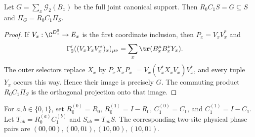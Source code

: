 \begin{lemma}
    \label{thm:mpo_joint_canonical_corner}
    \leanok
    Let $G=\sum_x\mathcal G_2(B_x)$ be the full joint canonical support.
    Then $R_0C_1S=G\subseteq S$ and
    $\Pi_G=R_0C_1\Pi_S$.
\end{lemma}
\begin{proof}
    \leanok
    If $V_x:\C^{D_x^0}\to E_x$ is the first coordinate inclusion, then
    $P_x=V_xV_x^*$ and
    \begin{align}
        \Gamma'_2((V_xY_xV_x^*)_x)_{\mu\nu}
         & =\sum_x\tr(B_x^\mu B_x^\nu Y_x).
        \label{eq:mpo_joint_canonical_boundary}
    \end{align}
    The outer selectors replace $X_x$ by $P_xX_xP_x$
    $=V_x(V_x^*X_xV_x)V_x^*$, and every tuple $Y_x$ occurs this way.
    Hence their image is precisely $G$. The commuting product
    $R_0C_1\Pi_S$ is the orthogonal projection onto that image.
\end{proof}

\begin{definition}
    \label{def:mpo_joint_outer_corners}
    \leanok
    For $a,b\in\{0,1\}$, set
    $R_0^{(0)}=R_0$, $R_0^{(1)}=I-R_0$,
    $C_1^{(0)}=C_1$, and $C_1^{(1)}=I-C_1$.
    Let $T_{ab}=R_0^{(a)}C_1^{(b)}$ and $S_{ab}=T_{ab}S$.
    The corresponding two-site physical phase pairs are
    $(00,00),(00,01),(10,00),(10,01)$.
\end{definition}

